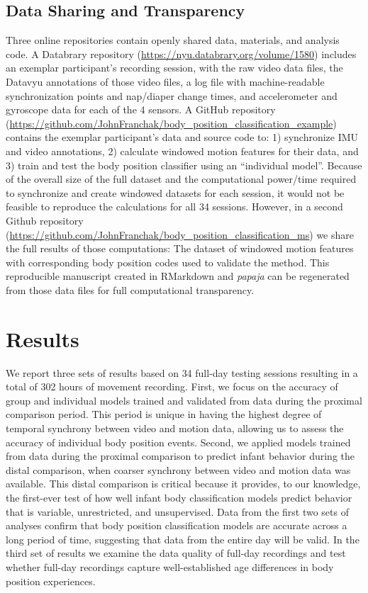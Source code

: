 \documentclass[
  man]{apa6}
\begin{document}
\hypertarget{data-sharing-and-transparency}{%
\subsection{Data Sharing and Transparency}\label{data-sharing-and-transparency}}

Three online repositories contain openly shared data, materials, and analysis code. A Databrary repository (\url{https://nyu.databrary.org/volume/1580}) includes an exemplar participant's recording session, with the raw video data files, the Datavyu annotations of those video files, a log file with machine-readable synchronization points and nap/diaper change times, and accelerometer and gyroscope data for each of the 4 sensors. A GitHub repository (\url{https://github.com/JohnFranchak/body_position_classification_example}) contains the exemplar participant's data and source code to: 1) synchronize IMU and video annotations, 2) calculate windowed motion features for their data, and 3) train and test the body position classifier using an ``individual model''. Because of the overall size of the full dataset and the computational power/time required to synchronize and create windowed datasets for each session, it would not be feasible to reproduce the calculations for all 34 sessions. However, in a second Github repository (\url{https://github.com/JohnFranchak/body_position_classification_ms}) we share the full results of those computations: The dataset of windowed motion features with corresponding body position codes used to validate the method. This reproducible manuscript created in RMarkdown and \emph{papaja} \autocite{papaja} can be regenerated from those data files for full computational transparency.

\hypertarget{results}{%
\section{Results}\label{results}}

We report three sets of results based on 34 full-day testing sessions resulting in a total of 302 hours of movement recording. First, we focus on the accuracy of group and individual models trained and validated from data during the proximal comparison period. This period is unique in having the highest degree of temporal synchrony between video and motion data, allowing us to assess the accuracy of individual body position events. Second, we applied models trained from data during the proximal comparison to predict infant behavior during the distal comparison, when coarser synchrony between video and motion data was available. This distal comparison is critical because it provides, to our knowledge, the first-ever test of how well infant body classification models predict behavior that is variable, unrestricted, and unsupervised. Data from the first two sets of analyses confirm that body position classification models are accurate across a long period of time, suggesting that data from the entire day will be valid. In the third set of results we examine the data quality of full-day recordings and test whether full-day recordings capture well-established age differences in body position experiences.
\end{document}
